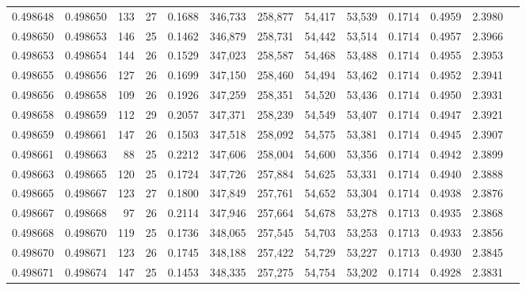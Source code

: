 \begin{tabular}{rrrrrrrrrrrrr}
0.498648 & 0.498650 & 133 &  27 &                                     0.1688 & 346,733 & 258,877 &  54,417 &  53,539 & 0.1714 & 0.4959 & 2.3980 \\
0.498650 & 0.498653 & 146 &  25 &                                     0.1462 & 346,879 & 258,731 &  54,442 &  53,514 & 0.1714 & 0.4957 & 2.3966 \\
0.498653 & 0.498654 & 144 &  26 &                                     0.1529 & 347,023 & 258,587 &  54,468 &  53,488 & 0.1714 & 0.4955 & 2.3953 \\
0.498655 & 0.498656 & 127 &  26 &                                     0.1699 & 347,150 & 258,460 &  54,494 &  53,462 & 0.1714 & 0.4952 & 2.3941 \\
0.498656 & 0.498658 & 109 &  26 &                                     0.1926 & 347,259 & 258,351 &  54,520 &  53,436 & 0.1714 & 0.4950 & 2.3931 \\
0.498658 & 0.498659 & 112 &  29 &                                     0.2057 & 347,371 & 258,239 &  54,549 &  53,407 & 0.1714 & 0.4947 & 2.3921 \\
0.498659 & 0.498661 & 147 &  26 &                                     0.1503 & 347,518 & 258,092 &  54,575 &  53,381 & 0.1714 & 0.4945 & 2.3907 \\
0.498661 & 0.498663 &  88 &  25 &                                     0.2212 & 347,606 & 258,004 &  54,600 &  53,356 & 0.1714 & 0.4942 & 2.3899 \\
0.498663 & 0.498665 & 120 &  25 &                                     0.1724 & 347,726 & 257,884 &  54,625 &  53,331 & 0.1714 & 0.4940 & 2.3888 \\
0.498665 & 0.498667 & 123 &  27 &                                     0.1800 & 347,849 & 257,761 &  54,652 &  53,304 & 0.1714 & 0.4938 & 2.3876 \\
0.498667 & 0.498668 &  97 &  26 &                                     0.2114 & 347,946 & 257,664 &  54,678 &  53,278 & 0.1713 & 0.4935 & 2.3868 \\
0.498668 & 0.498670 & 119 &  25 &                                     0.1736 & 348,065 & 257,545 &  54,703 &  53,253 & 0.1713 & 0.4933 & 2.3856 \\
0.498670 & 0.498671 & 123 &  26 &                                     0.1745 & 348,188 & 257,422 &  54,729 &  53,227 & 0.1713 & 0.4930 & 2.3845 \\
0.498671 & 0.498674 & 147 &  25 &                                     0.1453 & 348,335 & 257,275 &  54,754 &  53,202 & 0.1714 & 0.4928 & 2.3831 \\

\end{tabular}
